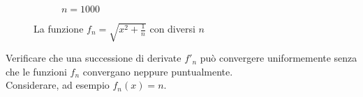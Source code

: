 \begin{exercise}
\begin{figure}[H]
\begin{subfigure}{.24\textwidth}
		\end{subfigure}
		\begin{subfigure}{.24\textwidth}
			\centering
			\caption{$n = 1000$}
		\end{subfigure}
		\caption{La funzione $f_n = \sqrt{x^2 + \frac{1}{n}}$ con diversi $n$}
		\label{fig:fn_sqrt_x2_1_over_n}
	\end{figure}
\end{exercise}
\begin{exercise}
	Verificare che una successione di derivate $f'_n$ può convergere uniformemente senza che le funzioni $f_n$ convergano neppure puntualmente.\\
	Considerare, ad esempio $f_n(x) = n$.
\end{exercise}

